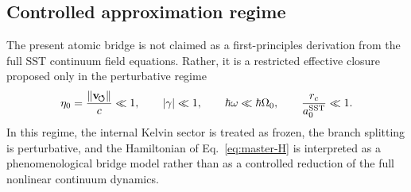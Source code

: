 \documentclass[11pt,a4paper]{article}
\begin{document}
    \subsection{Controlled approximation regime}
    The present atomic bridge is not claimed as a first-principles derivation from the full SST continuum field equations. Rather, it is a restricted effective closure proposed only in the perturbative regime
    \begin{equation}
        \eta_0=\frac{\lVert \mathbf{v}_{\!\boldsymbol{\circlearrowleft}}\rVert}{c}\ll 1,
        \qquad
        |\gamma|\ll 1,
        \qquad
        \hbar\omega \ll \hbar\Omega_0,
        \qquad
        \frac{r_c}{a_0^{\rm SST}}\ll 1.
    \end{equation}
    In this regime, the internal Kelvin sector is treated as frozen, the branch splitting is perturbative, and the Hamiltonian of Eq.~\eqref{eq:master-H} is interpreted as a phenomenological bridge model rather than as a controlled reduction of the full nonlinear continuum dynamics.
    
\end{document}
